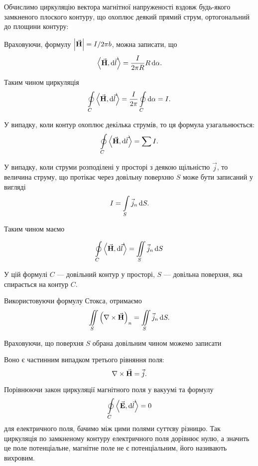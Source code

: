 Обчислимо циркуляцію вектора магнітної напруженості вздовж будь-якого замкненого плоского контуру, що охоплює деякий прямий струм, ортогональний до площини контуру:
\begin{figure}[H]
	\centering
\end{figure}

Враховуючи, формулу $\left| {\vec{\mathbf{H}}} \right| = I / 2 \pi b$, можна записати, що
\begin{equation}
	\langle \vecf H, \diff \vec l \rangle = \frac{I}{2 \pi R} R \diff \alpha.
\end{equation}

Таким чином циркуляція
\begin{equation}
	\Oint_C \langle \vecf H, \diff \vec l \rangle = \frac{I}{2 \pi} \Oint_C \diff \alpha = I.
\end{equation}

У випадку, коли контур охоплює декілька струмів, то ця формула узагальнюється:
\begin{equation}
	\Oint_C \langle \vecf H, \diff \vec l \rangle = \Sum I.
\end{equation}

У випадку, коли струми розподілені у просторі з деякою щільністю $\vec j$, то величина струму, що протікає через довільну поверхню $S$ може бути записаний у вигляді
\begin{equation}
	I = \displaystyle\int\limits_S \vec j_n \mathop{}\!\mathrm{d} S.
\end{equation}

Таким чином маємо 
\begin{law}
	\begin{equation}
		\Oint_C \langle \vecf H, \diff \vec l \rangle = \Iint_S \vec j_n \diff S
	\end{equation}
\end{law}

У цій формулі $C$ --- довільний контур у просторі, $S$ --- довільна поверхня, яка спирається на контур $C$. \medskip

Використовуючи формулу Стокса, отримаємо 
\begin{equation}
	\displaystyle\iint\limits_S \left(\nabla \times {\vec{\mathbf{H}}}\right)_n = \displaystyle\iint\limits_S \vec j_n \mathop{}\!\mathrm{d} S.
\end{equation}

Враховуючи, що поверхня $S$ обрана довільним чином можемо записати 
\begin{th_equation}[магнітостатики]
	Воно є частинним випадком третього рівняння поля:
	\begin{equation}
        \label{eq:magnetostatics-equation-third-field-equation}
		\nabla \times {\vec{\mathbf{H}}} = \vec j.
	\end{equation}
\end{th_equation}
Порівнюючи закон циркуляції магнітного поля у вакуумі та формулу
\begin{equation}
	\Oint_C \langle \vecf E, \diff \vec l \rangle = 0
\end{equation}
для електричного поля, бачимо між цими полями суттєву різницю. Так циркуляція по замкненому контуру електричного поля дорівнює нулю, а значить це поле потенціальне, магнітне поле не є потенціальним, його називають вихровим. \medskip

